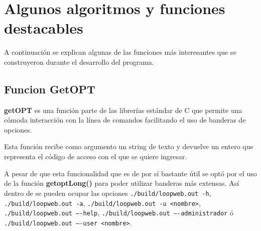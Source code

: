 \section{Algunos algoritmos y funciones destacables}
A continuación se explican algunas de las funciones más interesantes que se construyeron durante el desarrollo del programa.
\subsection{Funcion GetOPT}

\textbf{getOPT} es una función parte de las librerías estándar de C que permite una cómoda interacción con la línea de comandos facilitando el uso de banderas de opciones.

Esta función recibe como argumento un string de texto y devuelve un entero que representa el código de acceso con el que se quiere ingresar.

A pesar de que esta funcionalidad que es de por sí bastante útil se optó por el uso de la función \textbf{getoptLong()} para poder utilizar banderas más extensas. Así dentro de \loopweb se pueden ocupar las opciones \texttt{./build/loopweb.out -h},  \texttt{./build/loopweb.out -a}, \texttt{./build/loopweb.out -u <nombre>}, \texttt{./build/loopweb.out ----help}, \texttt{./build/loopweb.out ----administrador} ó \texttt{./build/loopweb.out ----user <nombre>}.


